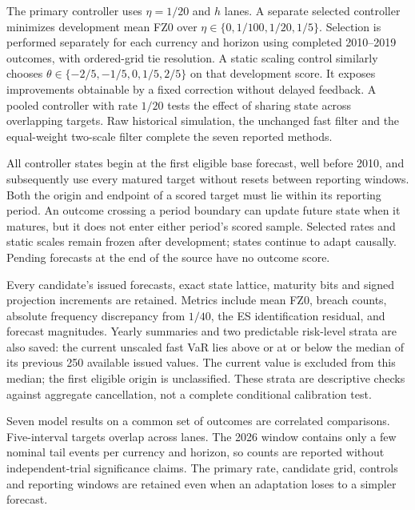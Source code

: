 \documentclass[11pt,a4paper]{article}
\theoremstyle{definition}\newtheorem{definition}[theorem]{Definition}
\begin{document}
The primary controller uses $\eta=1/20$ and $h$ lanes. A separate selected controller minimizes development mean FZ0 over $\eta\in\{0,1/100,1/20,1/5\}$. Selection is performed separately for each currency and horizon using completed 2010--2019 outcomes, with ordered-grid tie resolution. A static scaling control similarly chooses $\theta\in\{-2/5,-1/5,0,1/5,2/5\}$ on that development score. It exposes improvements obtainable by a fixed correction without delayed feedback. A pooled controller with rate $1/20$ tests the effect of sharing state across overlapping targets. Raw historical simulation, the unchanged fast filter and the equal-weight two-scale filter complete the seven reported methods.

All controller states begin at the first eligible base forecast, well before 2010, and subsequently use every matured target without resets between reporting windows. Both the origin and endpoint of a scored target must lie within its reporting period. An outcome crossing a period boundary can update future state when it matures, but it does not enter either period's scored sample. Selected rates and static scales remain frozen after development; states continue to adapt causally. Pending forecasts at the end of the source have no outcome score.

Every candidate's issued forecasts, exact state lattice, maturity bits and signed projection increments are retained. Metrics include mean FZ0, breach counts, absolute frequency discrepancy from $1/40$, the ES identification residual, and forecast magnitudes. Yearly summaries and two predictable risk-level strata are also saved: the current unscaled fast VaR lies above or at or below the median of its previous 250 available issued values. The current value is excluded from this median; the first eligible origin is unclassified. These strata are descriptive checks against aggregate cancellation, not a complete conditional calibration test.

Seven model results on a common set of outcomes are correlated comparisons. Five-interval targets overlap across lanes. The 2026 window contains only a few nominal tail events per currency and horizon, so counts are reported without independent-trial significance claims. The primary rate, candidate grid, controls and reporting windows are retained even when an adaptation loses to a simpler forecast.
\end{document}
